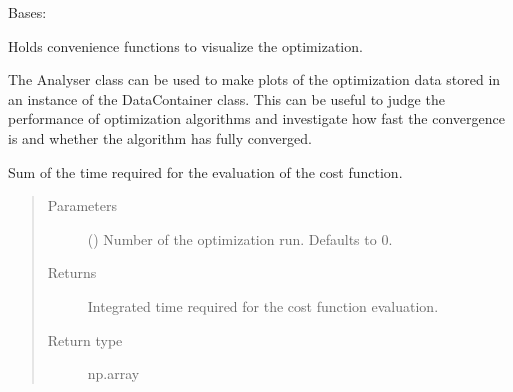 \documentclass[letterpaper,10pt,english]{sphinxmanual}
\begin{document}
\begin{fulllineitems}
\label{\detokenize{qsim:qsim.analyser.Analyser}}
Bases: 

Holds convenience functions to visualize the optimization.

The Analyser class can be used to make plots of the optimization data
stored in an instance of the DataContainer class. This can be useful to
judge the performance of optimization algorithms and investigate how fast
the convergence is and whether the algorithm has fully converged.

\begin{fulllineitems}
\label{\detokenize{qsim:qsim.analyser.Analyser.integral_cost_fkt_times}}
Sum of the time required for the evaluation of the cost
function.
\begin{quote}\begin{description}
\item[{Parameters}] \leavevmode
{} (\sphinxstyleliteralemphasis{\sphinxupquote{, }}) \textendash{} Number of the optimization run. Defaults to 0.

\item[{Returns}] \leavevmode
{} \textendash{} Integrated time required for the cost function evaluation.

\item[{Return type}] \leavevmode
np.array

\end{description}\end{quote}

\end{fulllineitems}



\end{fulllineitems}
\end{document}
